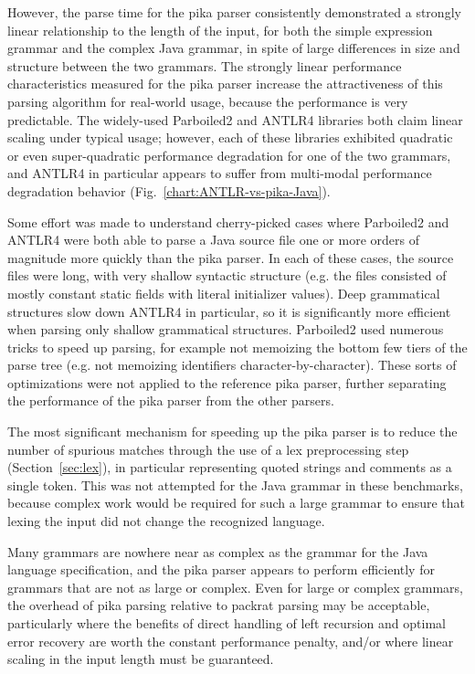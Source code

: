 \documentclass[manuscript,screen]{acmart}
\begin{document}
However, the parse time for the pika parser consistently demonstrated a strongly linear relationship to the length of the input, for both the simple expression grammar and the complex Java grammar, in spite of large differences in size and structure between the two grammars. The strongly linear performance characteristics measured for the pika parser increase the attractiveness of this parsing algorithm for real-world usage, because the performance is very predictable. The widely-used Parboiled2 and ANTLR4 libraries both claim linear scaling under typical usage; however, each of these libraries exhibited quadratic or even super-quadratic performance degradation for one of the two grammars, and ANTLR4 in particular appears to suffer from multi-modal performance degradation behavior (Fig.~\ref{chart:ANTLR-vs-pika-Java}).

Some effort was made to understand cherry-picked cases where Parboiled2 and ANTLR4 were both able to parse a Java source file one or more orders of magnitude more quickly than the pika parser. In each of these cases, the source files were long, with very shallow syntactic structure (e.g. the files consisted of mostly constant static fields with literal initializer values). Deep grammatical structures slow down ANTLR4 in particular, so it is significantly more efficient when parsing only shallow grammatical structures. Parboiled2 used numerous tricks to speed up parsing, for example not memoizing the bottom few tiers of the parse tree (e.g. not memoizing identifiers character-by-character). These sorts of optimizations were not applied to the reference pika parser, further separating the performance of the pika parser from the other parsers.

The most significant mechanism for speeding up the pika parser is to reduce the number of spurious matches through the use of a lex preprocessing step (Section~\ref{sec:lex}), in particular representing quoted strings and comments as a single token. This was not attempted for the Java grammar in these benchmarks, because complex work would be required for such a large grammar to ensure that lexing the input did not change the recognized language.

Many grammars are nowhere near as complex as the grammar for the Java language specification, and the pika parser appears to perform efficiently for grammars that are not as large or complex. Even for large or complex grammars, the overhead of pika parsing relative to packrat parsing may be acceptable, particularly where the benefits of direct handling of left recursion and optimal error recovery are worth the constant performance penalty, and/or where linear scaling in the input length must be guaranteed.
\end{document}
